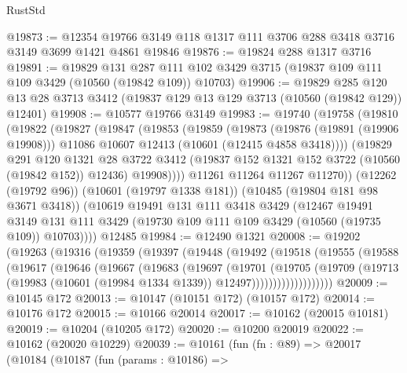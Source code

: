 \begin{lexlean}{RustStd}
\begin{coremodule}
@19873 := @12354 @19766 @3149 @118 @1317 @111 @3706 @288 @3418 @3716 @3149 @3699 @1421 @4861 @19846
@19876 := @19824 @288 @1317 @3716
@19891 := @19829
    @131
    @287
    @111
    @102
    @3429
    @3715
    (@19837 @109 @111 @109 @3429 (@10560 (@19842 @109)) @10703)
@19906 := @19829
    @285
    @120
    @13
    @28
    @3713
    @3412
    (@19837 @129 @13 @129 @3713 (@10560 (@19842 @129)) @12401)
@19908 := @10577 @19766 @3149
@19983 := @19740
    (@19758
      (@19810
        (@19822
          (@19827
            (@19847
              (@19853
                (@19859
                  (@19873
                    (@19876 (@19891 (@19906 @19908)))
                    @11086
                    @10607
                    @12413
                    (@10601 (@12415 @4858 @3418))))
                (@19829
                  @291
                  @120
                  @1321
                  @28
                  @3722
                  @3412
                  (@19837 @152 @1321 @152 @3722 (@10560 (@19842 @152)) @12436)
                  @19908))))
          @11261
          @11264
          @11267
          @11270))
      (@12262 (@19792 @96))
      (@10601 (@19797 @1338 @181))
      (@10485 (@19804 @181 @98 @3671 @3418))
      (@10619
        @19491
        @131
        @111
        @3418
        @3429
        (@12467
          @19491
          @3149
          @131
          @111
          @3429
          (@19730 @109 @111 @109 @3429 (@10560 (@19735 @109)) @10703))))
    @12485
@19984 := @12490 @1321
@20008 := @19202
    (@19263
      (@19316
        (@19359
          (@19397
            (@19448
              (@19492
                (@19518
                  (@19555
                    (@19588
                      (@19617
                        (@19646
                          (@19667
                            (@19683
                              (@19697
                                (@19701
                                  (@19705
                                    (@19709
                                      (@19713
                                        (@19983
                                          (@10601 (@19984 @1334 @1339))
                                          @12497)))))))))))))))))))
@20009 := @10145 @172
@20013 := @10147 (@10151 @172) (@10157 @172)
@20014 := @10176 @172
@20015 := @10166 @20014
@20017 := @10162 (@20015 @10181)
@20019 := @10204 (@10205 @172)
@20020 := @10200 @20019
@20022 := @10162 (@20020 @10229)
@20039 := @10161
    (fun (fn : @89) =>
    @20017
      (@10184
        (@10187
          (fun (params : @10186) =>

\end{coremodule}
\end{lexlean}
